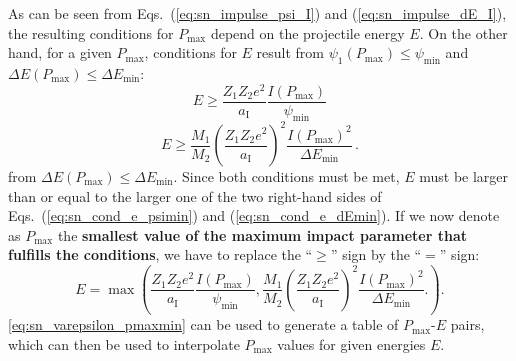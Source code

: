 As can be seen from Eqs.~(\ref{eq:sn_impulse_psi_I}) and (\ref{eq:sn_impulse_dE_I}), the resulting conditions for $P_\mathrm{max}$ depend on the projectile energy $E$.
On the other hand, for a given $P_\mathrm{max}$, conditions for $E$ result from $\psi_1(P_\mathrm{max}) \le \psi_\mathrm{min}$ and $\Delta E(P_\mathrm{max}) \le \Delta E_\mathrm{min}$:
%
\begin{equation}
    \label{eq:sn_cond_e_psimin}
    E \ge \frac{Z_1 Z_2 e^2}{a_\mathrm{I}}
        \frac{I(P_\mathrm{max})}{\psi_\mathrm{min}}
\end{equation}
%
\begin{equation}
    \label{eq:sn_cond_e_dEmin}
    E \ge \frac{M_1}{M_2} \left( \frac{Z_1 Z_2 e^2}{a_\mathrm{I}} \right) ^2
        \frac{I(P_\mathrm{max})^2}{\Delta E_\mathrm{min}} \, .
\end{equation}
%
from $\Delta E(P_\mathrm{max}) \le \Delta E_\mathrm{min}$.
Since both conditions must be met, $E$ must be larger than or equal to the larger one of the two right-hand sides of Eqs.~(\ref{eq:sn_cond_e_psimin}) and (\ref{eq:sn_cond_e_dEmin}).
If we now denote as $P_\mathrm{max}$ the \textbf{smallest value of the maximum impact parameter that fulfills the conditions}, we have to replace the ``$\ge$'' sign by the ``$=$'' sign:
%
\begin{equation}
    \label{eq:sn_varepsilon_pmaxmin}
    E = \max \left(
        \frac{Z_1 Z_2 e^2}{a_\mathrm{I}}
        \frac{I(P_\mathrm{max})}{\psi_\mathrm{min}},
        \frac{M_1}{M_2} \left( \frac{Z_1 Z_2 e^2}{a_\mathrm{I}} \right) ^2
        \frac{I(P_\mathrm{max})^2}{\Delta E_\mathrm{min}} .
    \right) .
\end{equation}
%
\cref{eq:sn_varepsilon_pmaxmin} can be used to generate a table of $P_\mathrm{max}$-$E$ pairs, which can then be used to interpolate $P_\mathrm{max}$ values for given energies $E$.

